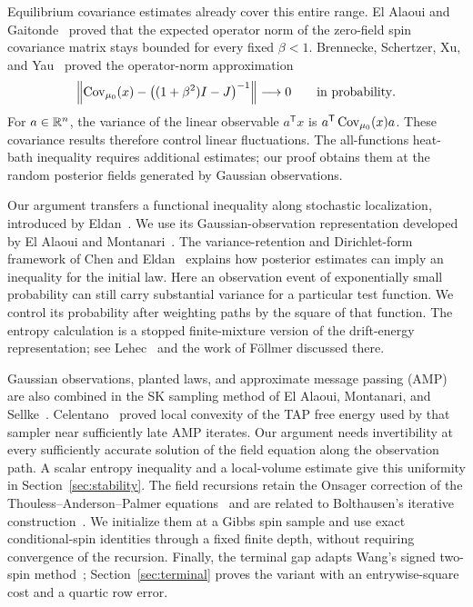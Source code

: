 Equilibrium covariance estimates already cover this entire range.
El Alaoui and Gaitonde~\cite[Theorem~1.1]{EAG2024} proved that the
expected operator norm of the zero-field spin covariance matrix stays
bounded for every fixed $\beta<1$. Brennecke, Schertzer, Xu, and
Yau~\cite[Theorem~1.1]{BSXY2024} proved the operator-norm approximation
\[
 \left\|\operatorname{Cov}_{\mu_0}(x)-\bigl((1+\beta^2)I-J\bigr)^{-1}\right\|
 \longrightarrow0
 \qquad\text{in probability}.
\]
For $a\in\mathbb R^n$, the variance of the linear observable $a^{\mathsf T}x$
is $a^{\mathsf T}\operatorname{Cov}_{\mu_0}(x)a$. These covariance results therefore
control linear fluctuations. The all-functions heat-bath inequality
requires additional estimates; our proof obtains them at the random
posterior fields generated by Gaussian observations.

Our argument transfers a functional inequality along stochastic
localization, introduced by Eldan~\cite{Eldan2013}.
We use its Gaussian-observation representation developed by El Alaoui
and Montanari~\cite{ElAlaouiMontanari2021}. The variance-retention and
Dirichlet-form framework of Chen and Eldan~\cite{CE2025} explains how
posterior estimates can imply an inequality for the initial law.
Here an observation event of exponentially small probability can still
carry substantial variance for a particular test function. We control
its probability after weighting paths by the square of that function.
The entropy calculation is a stopped finite-mixture version of the
drift-energy representation; see Lehec~\cite{Lehec2013} and the work
of F\"ollmer discussed there.

Gaussian observations, planted laws, and approximate message passing
(AMP) are also combined in the SK sampling method of El Alaoui,
Montanari, and Sellke~\cite{EAMS2022}. Celentano~\cite{Celentano2024}
proved local convexity of the TAP free energy used by that sampler near
sufficiently late AMP iterates. Our argument needs invertibility at every
sufficiently accurate solution of the field equation along the observation
path. A scalar entropy inequality and a local-volume estimate give this
uniformity in Section~\ref{sec:stability}. The field recursions retain the
Onsager correction of the
Thouless--Anderson--Palmer equations~\cite{TAP1977} and are related to
Bolthausen's iterative construction~\cite{Bolthausen2014}. We initialize
them at a Gibbs spin sample and use exact conditional-spin identities
through a fixed finite depth, without requiring convergence of the
recursion. Finally, the terminal gap adapts Wang's signed two-spin
method~\cite{Wang2026}; Section~\ref{sec:terminal} proves the variant
with an entrywise-square cost and a quartic row error.

